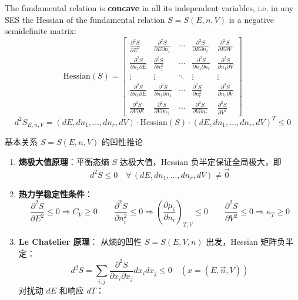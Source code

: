 \begin{thm}
\begin{enumerate}
    The fundamental relation is \textbf{concave} in all its independent variables, 
    i.e. in any SES the Hessian of the fundamental relation \( S = S(E, n, V) \) 
    is a negative semidefinite matrix:
    \[
    \text{Hessian}(S) =
    \begin{bmatrix}
    \frac{\partial^2 S}{\partial E^2} & \frac{\partial^2 S}{\partial E \partial n_1} & \cdots & \frac{\partial^2 S}{\partial E \partial n_r} & \frac{\partial^2 S}{\partial E \partial V} \\
    \frac{\partial^2 S}{\partial n_1 \partial E} & \frac{\partial^2 S}{\partial n_1^2} & \cdots & \frac{\partial^2 S}{\partial n_1 \partial n_r} & \frac{\partial^2 S}{\partial n_1 \partial V} \\
    \vdots & \vdots & \ddots & \vdots & \vdots \\
    \frac{\partial^2 S}{\partial n_r \partial E} & \frac{\partial^2 S}{\partial n_r \partial n_1} & \cdots & \frac{\partial^2 S}{\partial n_r^2} & \frac{\partial^2 S}{\partial n_r \partial V} \\
    \frac{\partial^2 S}{\partial V \partial E} & \frac{\partial^2 S}{\partial V \partial n_1} & \cdots & \frac{\partial^2 S}{\partial V \partial n_r} & \frac{\partial^2 S}{\partial V^2}
    \end{bmatrix}
    \]
    \[
    d^2 S_{E,n,V} = (dE, dn_1, \ldots, dn_r, dV) \cdot \text{Hessian}(S) \cdot (dE, dn_1, \ldots, dn_r, dV)^T \leq 0
    \]
\end{enumerate}
    \begin{add}
    基本关系 $S = S(E, n, V)$ 的凹性推论
\begin{enumerate}
  \item \textbf{熵极大值原理}：平衡态熵 $S$ 达极大值，Hessian 负半定保证全局极大，即
        \[
          d^2 S \leq 0 \quad \forall \, (dE, dn_1, \dots, dn_r, dV) \neq \vec{0}
        \]
  \item \textbf{热力学稳定性条件}：
        \[
          \frac{\partial^2 S}{\partial E^2} \leq 0 \Rightarrow C_V \geq 0 \qquad
          \frac{\partial^2 S}{\partial n_i^2} \leq 0 \Rightarrow \left(\frac{\partial \mu_i}{\partial n_i}\right)_{\!T,V} \leq 0 \qquad
          \frac{\partial^2 S}{\partial V^2} \leq 0 \Rightarrow \kappa_T \geq 0
        \]
  \item \textbf{Le Chatelier 原理}：
    从熵的凹性 \( S = S(E, V, n) \) 出发，Hessian 矩阵负半定：
    \[
    d^2 S = \sum_{i,j} \frac{\partial^2 S}{\partial x_i \partial x_j} dx_i dx_j \leq 0 \quad (x = (E, \vec{n}, V))
    \]
    对扰动 \( dE \) 和响应 \( dT \)：

\end{enumerate}
\end{add}
\end{thm}

